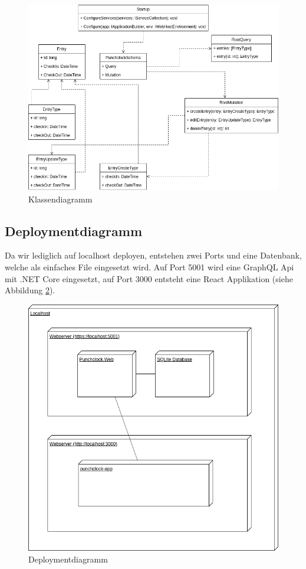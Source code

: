 \documentclass[a4paper, titlepage]{article}
\begin{document}
    \begin{figure}
        \includegraphics[width=\textwidth]{images/Klassendiagramm.png}
        \caption{Klassendiagramm}
        \label{classdiagram}
    \end{figure}

    \subsection{Deploymentdiagramm}
    Da wir lediglich auf localhost deployen, entstehen zwei Ports und eine
    Datenbank, welche als einfaches File eingesetzt wird. Auf Port 5001
    wird eine GraphQL Api mit .NET Core eingesetzt, auf Port 3000 entsteht
    eine React Applikation (siehe Abbildung \ref{deployment}).

    \begin{figure}
        \includegraphics[width=\textwidth]{images/Deploymentdiagramm.png}
        \caption{Deploymentdiagramm}
        \label{deployment}
    \end{figure}
\end{document}
